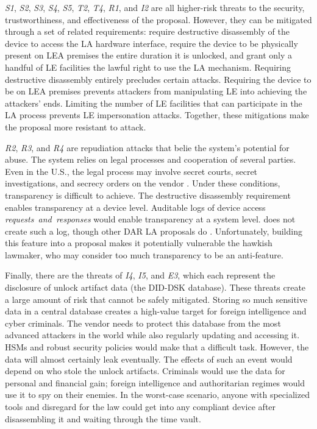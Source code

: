 \documentclass[manuscript,screen,review]{acmart}
\def\ii#1{\mbox{\textit{#1}}}
\begin{document}
\ii{S1}, \ii{S2}, \ii{S3}, \ii{S4}, \ii{S5}, \ii{T2}, \ii{T4}, \ii{R1}, and \ii{I2} are all higher-risk threats to the
security, trustworthiness, and effectiveness of the proposal. However, they can be mitigated through a set of related
requirements: require destructive disassembly of the device to access the \ac{LA} hardware interface, require the device
to be physically present on LEA premises the entire duration it is unlocked, and grant only a handful of LE facilities
the lawful right to use the \ac{LA} mechanism. Requiring destructive disassembly entirely precludes certain attacks.
Requiring the device to be on LEA premises prevents attackers from manipulating LE into achieving the attackers' ends.
Limiting the number of LE facilities that can participate in the \ac{LA} process prevents LE impersonation attacks.
Together, these mitigations make the proposal more resistant to attack.

\ii{R2}, \ii{R3}, and \ii{R4} are repudiation attacks that belie the system's potential for abuse. The system relies on
legal processes and cooperation of several parties. Even in the U.S., the legal process may involve secret courts,
secret investigations, and secrecy orders on the vendor \cite{shamsi_2011}. Under these conditions, transparency is
difficult to achieve. The destructive disassembly requirement enables transparency at a device level. Auditable logs of
device access \ii{requests and responses} would enable transparency at a system level. \ldawmsr does not create such a
log, though other \ac{DAR} \ac{LA} proposals do \cite{phan_key_2017} \cite{servan_schreiber_jje_2020}
\cite{goldwasser_public_2017}. Unfortunately, building this feature into a proposal makes it potentially vulnerable the
hawkish lawmaker, who may consider too much transparency to be an anti-feature.

Finally, there are the threats of \ii{I4}, \ii{I5}, and \ii{E3}, which each represent the disclosure of unlock artifact
data (the DID-DSK database). These threats create a large amount of risk that cannot be safely mitigated. Storing so
much sensitive data in a central database creates a high-value target for foreign intelligence and cyber criminals. The
vendor needs to protect this database from the most advanced attackers in the world while also regularly updating and
accessing it. \Acp{HSM} and robust security policies would make that a difficult task. However, the data will almost
certainly leak eventually. The effects of such an event would depend on who stole the unlock artifacts. Criminals would
use the data for personal and financial gain; foreign intelligence and authoritarian regimes would use it to spy on
their enemies. In the worst-case scenario, anyone with specialized tools and disregard for the law could get into any
compliant device after disassembling it and waiting through the time vault.
\end{document}
